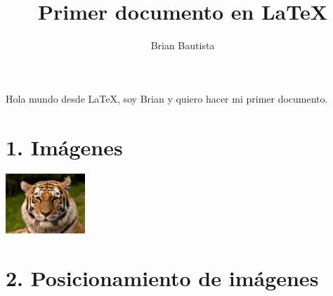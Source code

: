 \documentclass[legalpaper]{article}
\title{Primer documento en \LaTeX}
\author{Brian Bautista}
\begin{document}
    \maketitle
    Hola mundo desde \LaTeX, soy Brian y quiero hacer mi primer documento.

    \section*{1. Im\'agenes}

        \includegraphics[width = 3cm]{tigre.jpg}
    
    \section*{2. Posicionamiento de im\'agenes}

        \begin{figure}[h!]
            \raggedright
        \end{figure}
        
        \begin{figure}[h!]
            \centering
        \end{figure}

        \begin{figure}[h!]
            \raggedleft
        \end{figure}
\end{document}
